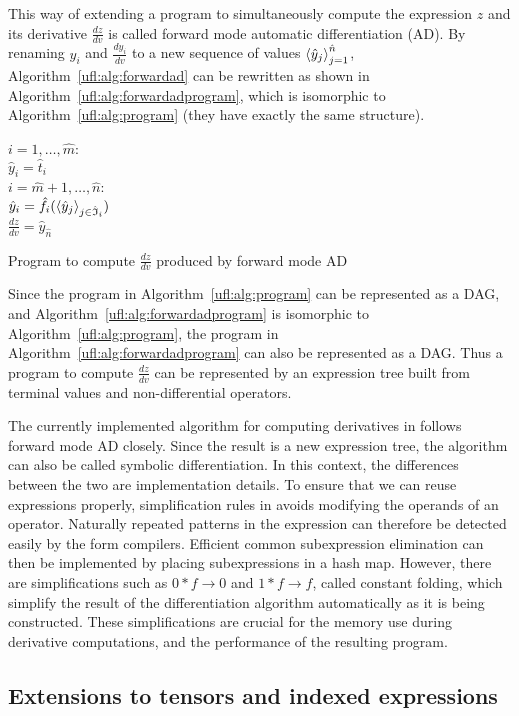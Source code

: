 This way of extending a program to simultaneously compute the expression
$z$ and its derivative $\frac{d z}{d v}$ is called forward mode automatic
differentiation (AD).  By renaming $y_i$ and $\frac{d
  y_i}{d v}$ to a new sequence of values $\left\langle{\hat y_j}\right\rangle_{j=1}^{\hat n}$,
  Algorithm~\ref{ufl:alg:forwardad} can be rewritten as shown in
Algorithm~\ref{ufl:alg:forwardadprogram}, which is isomorphic to
Algorithm~\ref{ufl:alg:program} (they have exactly the same structure).
\begin{algorithm}
\afor $i = 1, \ldots, \hat m$:\\
\tab $\hat y_i = \hat t_i$ \\
\afor $i = \hat m + 1, \ldots, \hat n$:\\
\tab $\hat y_i = \hat f_i(\left\langle{\hat y_j}\right\rangle_{j\in\hat{\mathfrak{I}}_i})$ \\
$\frac{d z}{d v} = \hat y_{\hat n}$
\caption{Program to compute $\frac{d z}{d v}$ produced by forward mode AD}
\label{ufl:alg:forwardadprogram}
\end{algorithm}

Since the program in Algorithm~\ref{ufl:alg:program} can be
represented as a DAG, and Algorithm~\ref{ufl:alg:forwardadprogram}
is isomorphic to Algorithm~\ref{ufl:alg:program}, the program in
Algorithm~\ref{ufl:alg:forwardadprogram} can also be represented as a DAG.
Thus a program to compute $\frac{d z}{d v}$ can be represented by an
expression tree built from terminal values and non-differential operators.

The currently implemented algorithm for computing derivatives in \ufl{}
follows forward mode AD closely. Since the result is a new expression
tree, the algorithm can also be called symbolic differentiation. In this
context, the differences between the two are implementation details.
To ensure that we can reuse expressions properly, simplification rules in
\ufl{} avoids modifying the operands of an operator.  Naturally repeated
patterns in the expression can therefore be detected easily by the
form compilers.  Efficient common subexpression elimination can then
be implemented by placing subexpressions in a hash map.  However, there
are simplifications such as $0*f\rightarrow 0$ and $1*f\rightarrow f$,
called constant folding, which simplify the result of the differentiation
algorithm automatically as it is being constructed.  These simplifications
are crucial for the memory use during derivative computations, and the
performance of the resulting program.
\subsection{Extensions to tensors and indexed expressions}


